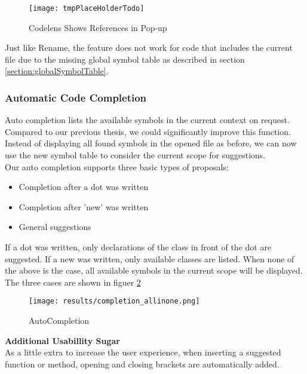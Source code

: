 \begin{figure}[H]
    \centering
    \texttt{[image: tmpPlaceHolderTodo]}
    \caption{Codelens Shows References in Pop-up}
    \label{fig:result_codelens_references_popup}
\end{figure}

Just like Rename, the feature does not work for code that includes the current file
due to the missing global symbol table as described in section \ref{section:globalSymbolTable}.

\subsubsection{Automatic Code Completion}
Auto completion lists the available symbols in the current context on request.
Compared to our previous thesis, we could significantly improve this function.
Instead of displaying all found symbols in the opened file as before,
we can now use the new symbol table to consider the current scope for suggestions. \\

Our auto completion supports three basic types of proposals:
\begin{itemize}
    \item Completion after a dot was written
    \item Completion after 'new' was written
    \item General suggestions
\end{itemize}

If a dot was written, only declarations of the class in front of the dot are suggested.
If a new was written, only available classes are listed.
When none of the above is the case, all available symbols in the current scope will be displayed.
The three cases are shown in figuer \ref{fig:result_completion}

\begin{figure}[H]
    \centering
    \texttt{[image: results/completion\_allinone.png]}
    \caption{AutoCompletion}
    \label{fig:result_completion}
\end{figure}



\textbf{Additional Usabillity Sugar}\\
As a little extra to increase the user experience, when inserting a suggested function or method,
opening and closing brackets are automatically added.


